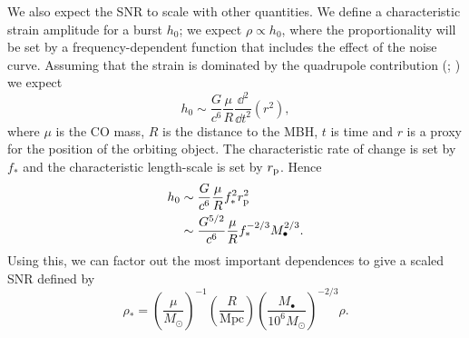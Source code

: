 We also expect the SNR to scale with other quantities. We define a characteristic strain amplitude for a burst $h_0$; we expect $\rho \propto h_0$, where the proportionality will be set by a frequency-dependent function that includes the effect of the noise curve. Assuming that the strain is dominated by the quadrupole contribution (\citealt[section 36.10]{Misner1973}; \citealt[section 17.9]{Hobson2006}) we expect
\begin{equation}
h_0 \sim \dfrac{G}{c^6}\dfrac{\mu}{R}\dfrac{\dd^2}{\dd t^2}\left(r^2\right),
\end{equation}
where $\mu$ is the CO mass, $R$ is the distance to the MBH, $t$ is time and $r$ is a proxy for the position of the orbiting object. The characteristic rate of change is set by $f_\ast$ and the characteristic length-scale is set by $r_\mathrm{p}$. Hence
\begin{align}
h_0 \sim {} & \dfrac{G}{c^6}\dfrac{\mu}{R}f_\ast^2 r_\mathrm{p}^2 \\
 \sim {} & \dfrac{G^{5/2}}{c^6}\dfrac{\mu}{R}f_\ast^{-2/3}M_\bullet^{2/3}.
\end{align}
Using this, we can factor out the most important dependences to give a scaled SNR defined by
\begin{equation}
\rho_\ast = \left(\dfrac{\mu}{M_\odot}\right)^{-1}\left(\dfrac{R}{\mathrm{Mpc}}\right)\left(\dfrac{M_\bullet}{10^6 M_\odot}\right)^{-2/3}\rho.
\label{eq:SNR-scaling}
\end{equation}

